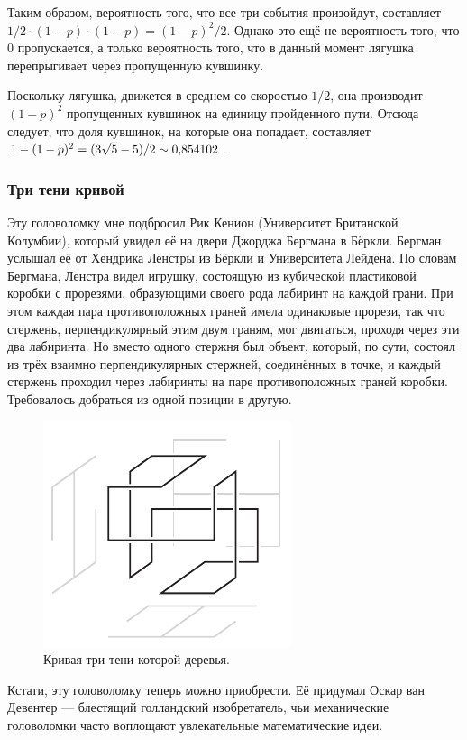 Таким образом, вероятность того, что все три события произойдут, составляет $1/2 \cdot (1 - p) \cdot (1 - p) = (1 - p)^2 / 2$.
Однако это ещё не вероятность того, что $0$ пропускается, а только вероятность того, что в данный момент лягушка перепрыгивает через пропущенную кувшинку.

Поскольку лягушка, движется в среднем со скоростью $1/2$, она производит $(1 - p)^2$ пропущенных кувшинок на единицу пройденного пути.
Отсюда следует, что доля кувшинок, на которые она попадает, составляет $1 - (1 - p)^2 \z= (3\sqrt5 - 5) / 2 \sim 0{,}854102$.

\subsubsection*{Три тени кривой}

Эту головоломку мне подбросил Рик Кенион (Университет Британской Колумбии), который увидел её на двери Джорджа Бергмана в Бёркли. 
Бергман услышал её от Хендрика Ленстры из Бёркли и Университета Лейдена.
По словам Бергмана, Ленстра видел игрушку, состоящую из кубической пластиковой коробки с прорезями, образующими своего рода лабиринт на каждой грани.
При этом каждая пара противоположных граней имела одинаковые прорези, так что стержень, перпендикулярный этим двум граням, мог двигаться, проходя через эти два лабиринта.
Но вместо одного стержня был объект, который, по сути, состоял из трёх взаимно перпендикулярных стержней, соединённых в точке, и каждый стержень проходил через лабиринты на паре противоположных граней коробки.
Требовалось добраться из одной позиции в другую.

\begin{figure}[b!]
\centering
\includegraphics[scale=1]{pics/tree3}
\caption{Кривая три тени которой деревья.}
\label{pic:tree3}
\end{figure}

Кстати, эту головоломку теперь можно приобрести.
Её придумал Оскар ван Девентер --- блестящий голландский изобретатель, чьи механические головоломки часто воплощают увлекательные математические идеи.

